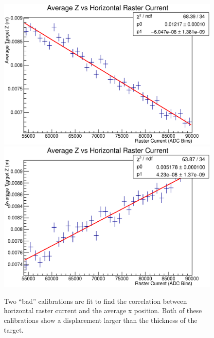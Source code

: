 \begin{figure}
	\includegraphics[width=\textwidth]{./app1/figures/old1_avgzvx.eps}
	\includegraphics[width=\textwidth]{./app1/figures/old2_avgzvx.eps}
	\caption{Two ``bad'' calibrations are fit to find the correlation between horizontal raster current and the average x position. Both of these calibrations show a displacement larger than the thickness of the target.}
\end{figure}

